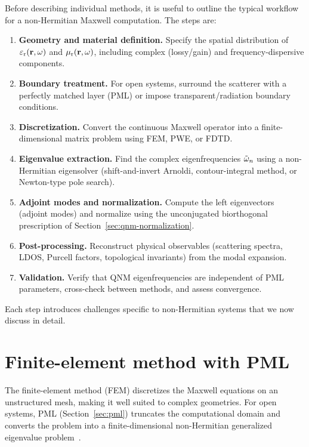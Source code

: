 Before describing individual methods, it is useful to outline the
typical workflow for a non-Hermitian Maxwell computation. The steps
are:
\begin{enumerate}
 \item \textbf{Geometry and material definition.} Specify the spatial
 distribution of $\varepsilon_{\mathrm{r}}(\mathbf{r},\omega)$ and $\mu_{\mathrm{r}}(\mathbf{r},\omega)$,
 including complex (lossy/gain) and frequency-dispersive components.
 \item \textbf{Boundary treatment.} For open systems, surround the
 scatterer with a perfectly matched layer (PML) or impose
 transparent/radiation boundary conditions.
 \item \textbf{Discretization.} Convert the continuous Maxwell
 operator into a finite-dimensional matrix problem using FEM, PWE,
 or FDTD.
 \item \textbf{Eigenvalue extraction.} Find the complex
 eigenfrequencies $\tilde{\omega}_n$ using a non-Hermitian eigensolver
 (shift-and-invert Arnoldi, contour-integral method, or
 Newton-type pole search).
 \item \textbf{Adjoint modes and normalization.} Compute the left
 eigenvectors (adjoint modes) and normalize using the unconjugated
 biorthogonal prescription of Section~\ref{sec:qnm-normalization}.
 \item \textbf{Post-processing.} Reconstruct physical observables
 (scattering spectra, LDOS, Purcell factors, topological invariants)
 from the modal expansion.
 \item \textbf{Validation.} Verify that QNM eigenfrequencies are
 independent of PML parameters, cross-check between methods, and
 assess convergence.
\end{enumerate}

Each step introduces challenges specific to non-Hermitian systems that
we now discuss in detail.


\section{Finite-element method with PML}
\label{sec:fem-pml}

The finite-element method (FEM) discretizes the Maxwell equations on an
unstructured mesh, making it well suited to complex geometries. For
open systems, PML (Section~\ref{sec:pml}) truncates the computational
domain and converts the problem into a finite-dimensional non-Hermitian
generalized eigenvalue problem~\cite{vial2014quasimodal}.

